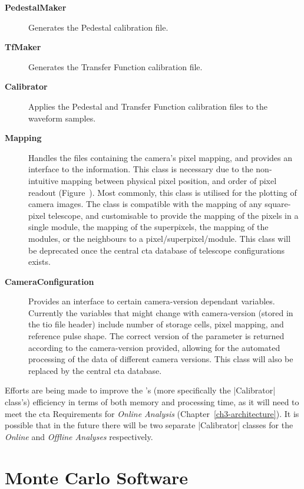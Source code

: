 \lstset{language=C++}
\begin{description}
\item [\textbf{PedestalMaker}] Generates the Pedestal calibration file.
\item [\textbf{TfMaker}] Generates the Transfer Function calibration file.
\item [\textbf{Calibrator}] Applies the Pedestal and Transfer Function calibration files to the waveform samples.
\item [\textbf{Mapping}] Handles the files containing the camera's pixel mapping, and provides an interface to the information. This class is necessary due to the non-intuitive mapping between physical pixel position, and order of pixel readout (Figure~). Most commonly, this class is utilised for the plotting of camera images. The class is compatible with the mapping of any square-pixel telescope, and customisable to provide the mapping of the pixels in a single module, the mapping of the superpixels, the mapping of the modules, or the neighbours to a pixel/superpixel/module. This class will be deprecated once the central \gls{cta} database of telescope configurations exists.
\item [\textbf{CameraConfiguration}] Provides an interface to certain camera-version dependant variables. Currently the variables that might change with camera-version (stored in the \gls{tio} file header) include number of storage cells, pixel mapping, and reference pulse shape. The correct version of the parameter is returned according to the camera-version provided, allowing for the automated processing of the data of different camera versions. This class will also be replaced by the central \gls{cta} database.
\end{description}

Efforts are being made to improve the 's (more specifically the |Calibrator| class's) efficiency in terms of both memory and processing time, as it will need to meet the \gls{cta} Requirements for \textit{Online Analysis} (Chapter~\ref{ch3-architecture}). It is possible that in the future there will be two separate |Calibrator| classes for the \textit{Online} and \textit{Offline Analyses} respectively.

\section{Monte Carlo Software}

